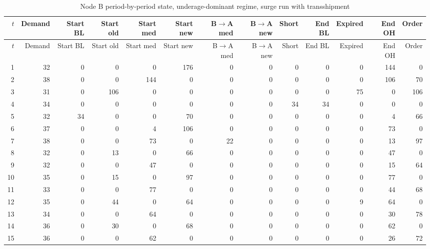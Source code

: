 \documentclass[11pt]{article}
\begin{document}
\begin{landscape}
\begin{longtable}{rrrrrrrrrrrrr}
\caption{Node B period-by-period state, underage-dominant regime, surge run with transshipment}\label{tab:appendix-underage-b}\\
\toprule
$t$ & Demand & Start BL & Start old & Start med & Start new & B$\rightarrow$A med & B$\rightarrow$A new & Short & End BL & Expired & End OH & Order \\
\midrule
\endfirsthead
\toprule
$t$ & Demand & Start BL & Start old & Start med & Start new & B$\rightarrow$A med & B$\rightarrow$A new & Short & End BL & Expired & End OH & Order \\
\midrule
\endhead
1 & 32 & 0 & 0 & 0 & 176 & 0 & 0 & 0 & 0 & 0 & 144 & 0 \\
2 & 38 & 0 & 0 & 144 & 0 & 0 & 0 & 0 & 0 & 0 & 106 & 70 \\
3 & 31 & 0 & 106 & 0 & 0 & 0 & 0 & 0 & 0 & 75 & 0 & 106 \\
4 & 34 & 0 & 0 & 0 & 0 & 0 & 0 & 34 & 34 & 0 & 0 & 0 \\
5 & 32 & 34 & 0 & 0 & 70 & 0 & 0 & 0 & 0 & 0 & 4 & 66 \\
6 & 37 & 0 & 0 & 4 & 106 & 0 & 0 & 0 & 0 & 0 & 73 & 0 \\
7 & 38 & 0 & 0 & 73 & 0 & 22 & 0 & 0 & 0 & 0 & 13 & 97 \\
8 & 32 & 0 & 13 & 0 & 66 & 0 & 0 & 0 & 0 & 0 & 47 & 0 \\
9 & 32 & 0 & 0 & 47 & 0 & 0 & 0 & 0 & 0 & 0 & 15 & 64 \\
10 & 35 & 0 & 15 & 0 & 97 & 0 & 0 & 0 & 0 & 0 & 77 & 0 \\
11 & 33 & 0 & 0 & 77 & 0 & 0 & 0 & 0 & 0 & 0 & 44 & 68 \\
12 & 35 & 0 & 44 & 0 & 64 & 0 & 0 & 0 & 0 & 9 & 64 & 0 \\
13 & 34 & 0 & 0 & 64 & 0 & 0 & 0 & 0 & 0 & 0 & 30 & 78 \\
14 & 36 & 0 & 30 & 0 & 68 & 0 & 0 & 0 & 0 & 0 & 62 & 0 \\
15 & 36 & 0 & 0 & 62 & 0 & 0 & 0 & 0 & 0 & 0 & 26 & 72 \\
\bottomrule
\end{longtable}


\end{landscape}
\end{document}
